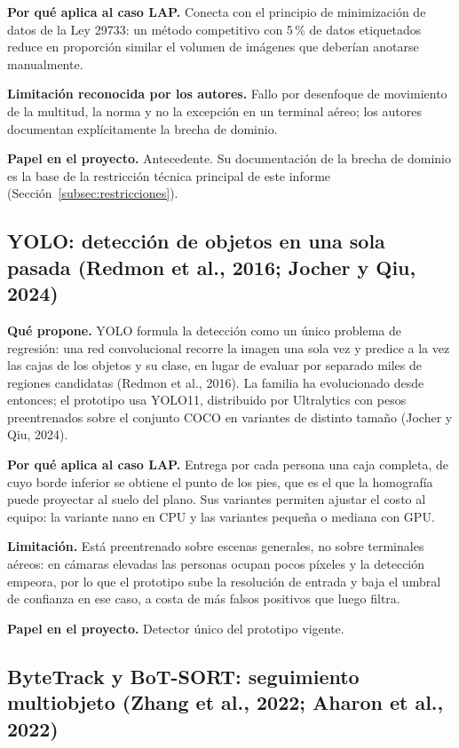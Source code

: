 \textbf{Por qué aplica al caso LAP.} Conecta con el principio de minimización de datos de la
Ley 29733: un método competitivo con 5\,\% de datos etiquetados reduce en proporción similar
el volumen de imágenes que deberían anotarse manualmente.

\textbf{Limitación reconocida por los autores.} Fallo por desenfoque de movimiento de la
multitud, la norma y no la excepción en un terminal aéreo; los autores documentan
explícitamente la brecha de dominio.

\textbf{Papel en el proyecto.} Antecedente. Su documentación de la brecha de dominio es la
base de la restricción técnica principal de este informe (Sección~\ref{subsec:restricciones}).

\subsection{YOLO: detección de objetos en una sola pasada (Redmon et al., 2016; Jocher y Qiu, 2024)}
\label{subsec:yolo}

\textbf{Qué propone.} YOLO formula la detección como un único problema de regresión: una red
convolucional recorre la imagen una sola vez y predice a la vez las cajas de los objetos y su clase,
en lugar de evaluar por separado miles de regiones candidatas (Redmon et al., 2016). La familia
ha evolucionado desde entonces; el prototipo usa YOLO11, distribuido por Ultralytics con
pesos preentrenados sobre el conjunto COCO en variantes de distinto tamaño (Jocher y Qiu,
2024).

\textbf{Por qué aplica al caso LAP.} Entrega por cada persona una caja completa, de cuyo borde
inferior se obtiene el punto de los pies, que es el que la homografía puede proyectar al suelo
del plano. Sus variantes permiten ajustar el costo al equipo: la variante nano en CPU y las
variantes pequeña o mediana con GPU.

\textbf{Limitación.} Está preentrenado sobre escenas generales, no sobre terminales aéreos: en
cámaras elevadas las personas ocupan pocos píxeles y la detección empeora, por lo que el
prototipo sube la resolución de entrada y baja el umbral de confianza en ese caso, a costa de
más falsos positivos que luego filtra.

\textbf{Papel en el proyecto.} Detector único del prototipo vigente.

\subsection{ByteTrack y BoT-SORT: seguimiento multiobjeto (Zhang et al., 2022; Aharon et al., 2022)}
\label{subsec:bytetrack}

